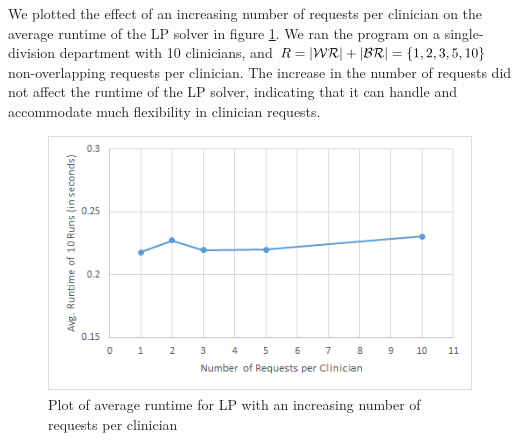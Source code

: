 We plotted the effect of an increasing number of requests per clinician on the average runtime of the LP solver in figure \ref{fig:avg-runtime-requests}. We ran the program on a single-division department with 10 clinicians, and $R = \abs{\mathcal{WR}} + \abs{\mathcal{BR}} = \{1, 2, 3, 5, 10\}$ non-overlapping requests per clinician. The increase in the number of requests did not affect the runtime of the LP solver, indicating that it can handle and accommodate much flexibility in clinician requests.

\begin{figure}[h]
	\centering
	\includegraphics[scale=.6]{fig/avg_runtime_requests}
	\caption{Plot of average runtime for LP with an increasing number of requests per clinician}
	\label{fig:avg-runtime-requests}
\end{figure}

